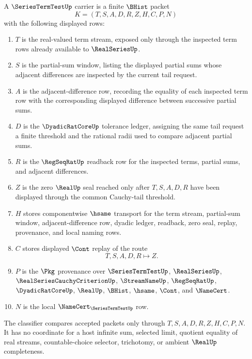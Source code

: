 \begin{definition}
\label{def:series-term-test-carrier}
A $\SeriesTermTestUp$ carrier is a finite $\BHist$ packet
$$
K=(T,S,A,D,R,Z,H,C,P,N)
$$
with the following displayed rows:
\begin{enumerate}
\item $T$ is the real-valued term stream, exposed only through the inspected term rows already available to $\RealSeriesUp$.
\item $S$ is the partial-sum window, listing the displayed partial sums whose adjacent differences are inspected by the current tail request.
\item $A$ is the adjacent-difference row, recording the equality of each inspected term row with the corresponding displayed difference between successive partial sums.
\item $D$ is the $\DyadicRatCoreUp$ tolerance ledger, assigning the same tail request a finite threshold and the rational radii used to compare adjacent partial sums.
\item $R$ is the $\RegSeqRatUp$ readback row for the inspected terms, partial sums, and adjacent differences.
\item $Z$ is the zero $\RealUp$ seal reached only after $T,S,A,D,R$ have been displayed through the common Cauchy-tail threshold.
\item $H$ stores componentwise $\hsame$ transport for the term stream, partial-sum window, adjacent-difference row, dyadic ledger, readback, zero seal, replay, provenance, and local naming rows.
\item $C$ stores displayed $\Cont$ replay of the route
$$
T,S,A,D,R \longmapsto Z .
$$
\item $P$ is the $\Pkg$ provenance over $\SeriesTermTestUp$, $\RealSeriesUp$, $\RealSeriesCauchyCriterionUp$, $\StreamNameUp$, $\RegSeqRatUp$, $\DyadicRatCoreUp$, $\RealUp$, $\BHist$, $\hsame$, $\Cont$, and $\NameCert$.
\item $N$ is the local $\NameCert_{\SeriesTermTestUp}$ row.
\end{enumerate}
The classifier compares accepted packets only through $T,S,A,D,R,Z,H,C,P,N$. It has no coordinate for a host infinite sum, selected limit, quotient equality of real streams, countable-choice selector, trichotomy, or ambient $\RealUp$ completeness.
\end{definition}

